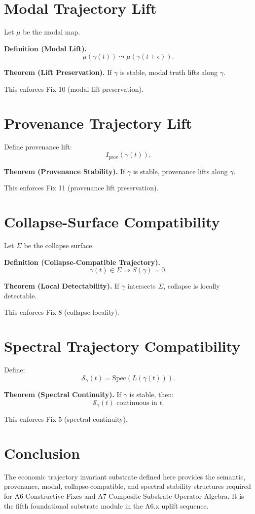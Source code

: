 \documentclass[11pt]{article}
\begin{document}
\section{Modal Trajectory Lift}

Let $\mu$ be the modal map.

\textbf{Definition (Modal Lift).}
\[
\mu(\gamma(t)) \leadsto \mu(\gamma(t+\epsilon)).
\]

\textbf{Theorem (Lift Preservation).}
If $\gamma$ is stable, modal truth lifts along $\gamma$.

This enforces Fix 10 (modal lift preservation).

\section{Provenance Trajectory Lift}

Define provenance lift:
\[
I_{\mathrm{prov}}(\gamma(t)).
\]

\textbf{Theorem (Provenance Stability).}
If $\gamma$ is stable, provenance lifts along $\gamma$.

This enforces Fix 11 (provenance lift preservation).

\section{Collapse-Surface Compatibility}

Let $\Sigma$ be the collapse surface.

\textbf{Definition (Collapse-Compatible Trajectory).}
\[
\gamma(t) \in \Sigma \Rightarrow S(\gamma) = 0.
\]

\textbf{Theorem (Local Detectability).}
If $\gamma$ intersects $\Sigma$, collapse is locally detectable.

This enforces Fix 8 (collapse locality).

\section{Spectral Trajectory Compatibility}

Define:
\[
\mathcal{S}_{\gamma}(t) = \mathrm{Spec}(L(\gamma(t))).
\]

\textbf{Theorem (Spectral Continuity).}
If $\gamma$ is stable, then:
\[
\mathcal{S}_{\gamma}(t) \text{ continuous in } t.
\]

This enforces Fix 5 (spectral continuity).

\section{Conclusion}

The economic trajectory invariant substrate defined here provides the semantic,
provenance, modal, collapse-compatible, and spectral stability structures
required for A6 Constructive Fixes and A7 Composite Substrate Operator Algebra.
It is the fifth foundational substrate module in the A6.x uplift sequence.
\end{document}
